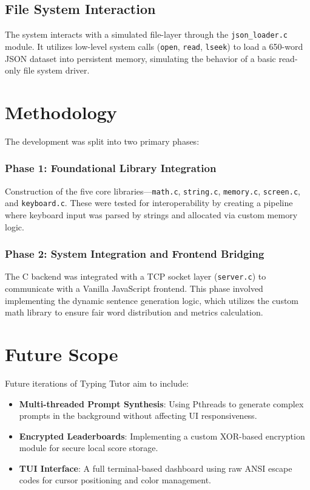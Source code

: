 \documentclass[conference]{IEEEtran}
\begin{document}
\subsection{File System Interaction}
The system interacts with a simulated file-layer through the \texttt{json\_loader.c} module. It utilizes low-level system calls (\texttt{open}, \texttt{read}, \texttt{lseek}) to load a 650-word JSON dataset into persistent memory, simulating the behavior of a basic read-only file system driver.

\section{Methodology}
The development was split into two primary phases:
\subsubsection{Phase 1: Foundational Library Integration}
Construction of the five core libraries—\texttt{math.c}, \texttt{string.c}, \texttt{memory.c}, \texttt{screen.c}, and \texttt{keyboard.c}. These were tested for interoperability by creating a pipeline where keyboard input was parsed by strings and allocated via custom memory logic.
\subsubsection{Phase 2: System Integration and Frontend Bridging}
The C backend was integrated with a TCP socket layer (\texttt{server.c}) to communicate with a Vanilla JavaScript frontend. This phase involved implementing the dynamic sentence generation logic, which utilizes the custom math library to ensure fair word distribution and metrics calculation.

\section{Future Scope}
Future iterations of Typing Tutor aim to include:
\begin{itemize}
    \item \textbf{Multi-threaded Prompt Synthesis}: Using Pthreads to generate complex prompts in the background without affecting UI responsiveness.
    \item \textbf{Encrypted Leaderboards}: Implementing a custom XOR-based encryption module for secure local score storage.
    \item \textbf{TUI Interface}: A full terminal-based dashboard using raw ANSI escape codes for cursor positioning and color management.
\end{itemize}
\end{document}
